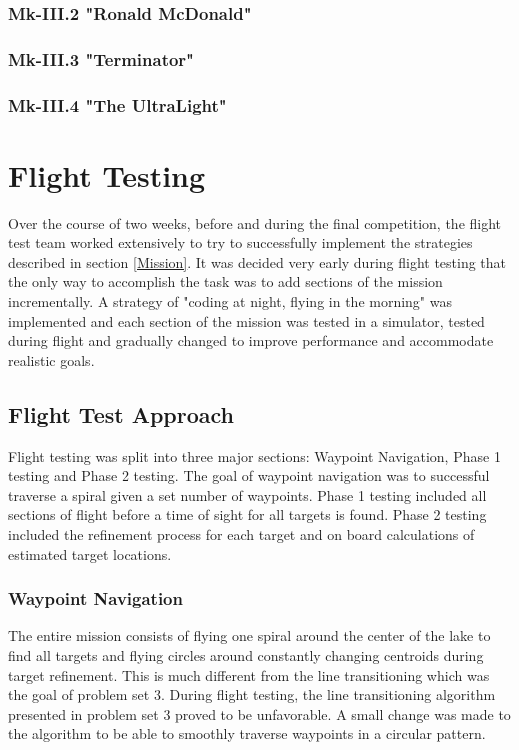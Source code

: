 \documentclass[11pt]{article}
\begin{document}
	\subsubsection{Mk-III.2 "Ronald McDonald"}
	\label{mk3.2}
	\subsubsection{Mk-III.3 "Terminator"}
	\label{mk3.3}
	\subsubsection{Mk-III.4 "The UltraLight"}
	\label{mk3.4}


\section{Flight Testing}
	\label{FlightTesting}
	Over the course of two weeks, before and during the final competition, the flight test team worked extensively to try to successfully implement the strategies described in section \ref{Mission}. It was decided very early during flight testing that the only way to accomplish the task was to add sections of the mission incrementally. A strategy of "coding at night, flying in the morning" was implemented and each section of the mission was tested in a simulator, tested during flight and gradually changed to improve performance and accommodate realistic goals.

	\subsection{Flight Test Approach}
	\label{FltTstAppr}
	Flight testing was split into three major sections: Waypoint Navigation, Phase 1 testing and Phase 2 testing. The goal of waypoint navigation was to successful traverse a spiral given a set number of waypoints. Phase 1 testing included all sections of flight before a time of sight for all targets is found. Phase 2 testing included the refinement process for each target and on board calculations of estimated target locations.

	\subsubsection{Waypoint Navigation}
	The entire mission consists of flying one spiral around the center of the lake to find all targets and flying circles around constantly changing centroids during target refinement. This is much different from the line transitioning which was the goal of problem set 3. During flight testing, the line transitioning algorithm presented in problem set 3 proved to be unfavorable. A small change was made to the algorithm to be able to smoothly traverse waypoints in a circular pattern.\\
\end{document}

